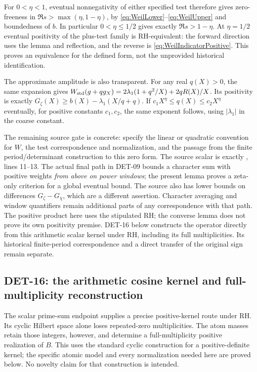 \documentclass[11pt,a4paper]{article}
\newcommand{\fid}[1]{\textsf{#1}}
\begin{document}
For $0<\eta<1$, eventual nonnegativity of either specified test therefore gives zero-freeness in $\Re s>\max(\eta,1-\eta)$, by \eqref{eq:WeilLower}--\eqref{eq:WeilUpper} and boundedness of $b$. In particular $0<\eta\le1/2$ gives exactly $\Re s>1-\eta$. At $\eta=1/2$ eventual positivity of the plus-test family is RH-equivalent: the forward direction uses the lemma and reflection, and the reverse is \eqref{eq:WeilIndicatorPositive}. This proves an equivalence for the defined form, not the unprovided historical identification.

The approximate amplitude is also transparent. For any real $q(X)>0$, the same expansion gives
$W_{\rm std}(g+qg_X)=2\lambda_1(1+q^2/X)+2qR(X)/X$.
Its positivity is exactly $G_\zeta(X)\ge b(X)-\lambda_1(X/q+q)$.
If $c_1X^\eta\le q(X)\le c_2X^\eta$ eventually, for positive constants $c_1,c_2$, the same exponent follows, using $|\lambda_1|$ in the coarse constant.

The remaining source gate is concrete: specify the linear or quadratic convention for $W$, the test correspondence and normalization, and the passage from the finite period/determinant construction to this zero form. The source scalar is exactly , lines 11--13. The actual final path in \fid{DET-09} bounds a character sum with positive weights \emph{from above on power windows}; the present lemma proves a zeta-only criterion for a global eventual bound. The source also has lower bounds on differences $G_\zeta-G_\chi$, which are a different assertion. Character averaging and window quantifiers remain additional parts of any correspondence with that path. The positive product here uses the stipulated RH; the converse lemma does not prove its own positivity premise. \fid{DET-16} below constructs the operator directly from this arithmetic scalar kernel under RH, including its full multiplicities. Its historical finite-period correspondence and a direct transfer of the original sign remain separate.

\subsection{DET-16: the arithmetic cosine kernel and full-multiplicity reconstruction}
The scalar prime-sum endpoint supplies a precise positive-kernel route under
RH. Its cyclic Hilbert space alone loses repeated-zero multiplicities.
The atom masses retain those integers, however, and determine a
full-multiplicity positive realization of \(B\). This uses the standard
cyclic construction for a positive-definite kernel; the specific atomic
model and every normalization needed here are proved below. No novelty
claim for that construction is intended.
\end{document}
